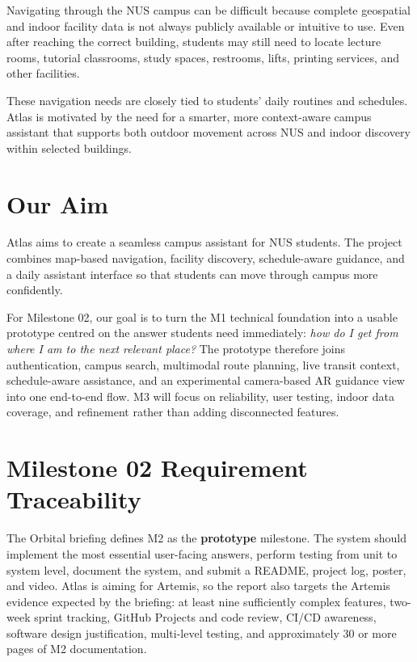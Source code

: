 \documentclass[11pt]{article}
\begin{document}
Navigating through the NUS campus can be difficult because complete geospatial and indoor facility data is not always publicly available or intuitive to use. Even after reaching the correct building, students may still need to locate lecture rooms, tutorial classrooms, study spaces, restrooms, lifts, printing services, and other facilities.

These navigation needs are closely tied to students' daily routines and schedules. Atlas is motivated by the need for a smarter, more context-aware campus assistant that supports both outdoor movement across NUS and indoor discovery within selected buildings.

\section*{Our Aim}

Atlas aims to create a seamless campus assistant for NUS students. The project combines map-based navigation, facility discovery, schedule-aware guidance, and a daily assistant interface so that students can move through campus more confidently.

For Milestone 02, our goal is to turn the M1 technical foundation into a usable prototype centred on the answer students need immediately: \emph{how do I get from where I am to the next relevant place?} The prototype therefore joins authentication, campus search, multimodal route planning, live transit context, schedule-aware assistance, and an experimental camera-based AR guidance view into one end-to-end flow. M3 will focus on reliability, user testing, indoor data coverage, and refinement rather than adding disconnected features.

\section*{Milestone 02 Requirement Traceability}

The Orbital briefing defines M2 as the \textbf{prototype} milestone. The system should implement the most essential user-facing answers, perform testing from unit to system level, document the system, and submit a README, project log, poster, and video. Atlas is aiming for Artemis, so the report also targets the Artemis evidence expected by the briefing: at least nine sufficiently complex features, two-week sprint tracking, GitHub Projects and code review, CI/CD awareness, software design justification, multi-level testing, and approximately 30 or more pages of M2 documentation.
\end{document}
